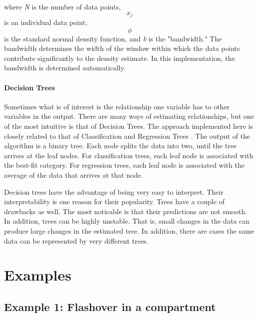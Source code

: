 \documentclass[12pt,twoside]{book}
\begin{document}
where \textit{N} is the number of data points, \[x_j\] is an individual data point, \[\phi\] is the standard normal density function, and \textit{b} is the "bandwidth." The bandwidth determines the width of the window within which the data points contribute significantly to the density estimate. In this implementation, the bandwidth is determined automatically.

\subsubsection{Decision Trees}

Sometimes what is of interest is the relationship one variable has to other variables in the output. There are many ways of estimating relationships, but one of the most intuitive is that of Decision Trees. The approach implemented here is closely related to that of Classification and Regression Trees \cite{Haste_2009}. The output of the algorithm is a binary tree. Each node splits the data into two, until the tree arrives at the leaf nodes. For classification trees, each leaf node is associated with the best-fit category. For regression trees, each leaf node is associated with the average of the data that arrives at that node.

Decision trees have the advantage of being very easy to interpret. Their interpretability is one reason for their popularity. Trees have a couple of drawbacks as well. The most noticable is that their predictions are not smooth. In addition, trees can be highly unstable. That is, small changes in the data can produce large changes in the estimated tree. In addition, there are cases the same data can be represented by very different trees.

%
%

\chapter{Examples}

%
%

\section{Example 1: Flashover in a compartment}
\end{document}
